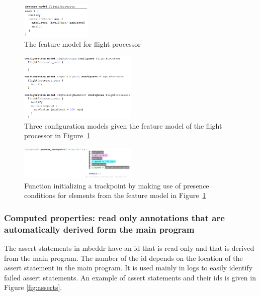 \documentclass[preprint,numbers,10pt]{sigplanconf}
\begin{document}
\begin{figure}[H]
	\centering
	\includegraphics[width=0.30\textwidth]{screens/FeatureModelFlightProcessor.png}
	\caption{The feature model for flight processor}
	\label{fig:featureModel}
\end{figure}

\begin{figure}[H]
	\centering
	\includegraphics[width=0.50\textwidth]{screens/ConfigurationModels}
	\caption{Three configuration models given the feature model of the flight processor in Figure~\ref{fig:featureModel}}
	\label{fig:configs}
\end{figure}

\begin{figure}[H]
	\centering
	\includegraphics[width=0.50\textwidth]{screens/process_trackpoint.png}
	\caption{Function initializing a trackpoint by making use of presence conditions for elements from the
feature model in Figure~\ref{fig:featureModel}}
	\label{fig:presenceCond}
\end{figure}
\subsubsection{Computed properties: read only annotations that are automatically derived form the main program}
The assert statements in mbeddr have an id that is read-only and that is derived from the main program. The number of the
id depends on the location of the assert statement in the main program. It is used mainly in logs  to
easily identify failed assert statements. An example of assert statements and their ids is given in Figure \ref{fig:asserts}.
\end{document}
